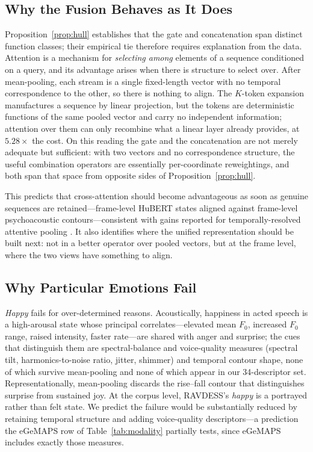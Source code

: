 \documentclass[journal,onecolumn,11pt,draftclsnofoot]{IEEEtran}   %
\begin{document}
\subsection{Why the Fusion Behaves as It Does}
\label{sec:why-fusion}
Proposition~\ref{prop:hull} establishes that the gate and concatenation span
distinct function classes; their empirical tie therefore requires explanation
from the data. Attention is a mechanism for \emph{selecting among} elements of a
sequence conditioned on a query, and its advantage arises when there is
structure to select over. After mean-pooling, each stream is a single
fixed-length vector with no temporal correspondence to the other, so there is
nothing to align. The $K$-token expansion manufactures a sequence by linear
projection, but the tokens are deterministic functions of the same pooled vector
and carry no independent information; attention over them can only recombine
what a linear layer already provides, at $5.28\times$ the cost. On this reading
the gate and the concatenation are not merely adequate but sufficient: with two
vectors and no correspondence structure, the useful combination operators are
essentially per-coordinate reweightings, and both span that space from opposite
sides of Proposition~\ref{prop:hull}.

This predicts that cross-attention should become advantageous as soon as genuine
sequences are retained---frame-level HuBERT states aligned against frame-level
psychoacoustic contours---consistent with gains reported for temporally-resolved
attentive pooling \cite{leygue2025attentivepooling}. It also identifies where
the unified representation should be built next: not in a better operator over
pooled vectors, but at the frame level, where the two views have something to
align.

\subsection{Why Particular Emotions Fail}
\label{sec:why-fail}
\emph{Happy} fails for over-determined reasons. Acoustically, happiness in acted
speech is a high-arousal state whose principal correlates---elevated mean $F_0$,
increased $F_0$ range, raised intensity, faster rate---are shared with anger and
surprise; the cues that distinguish them are spectral-balance and voice-quality
measures (spectral tilt, harmonics-to-noise ratio, jitter, shimmer) and temporal
contour shape, none of which survive mean-pooling and none of which appear in
our 34-descriptor set. Representationally, mean-pooling discards the rise--fall
contour that distinguishes surprise from sustained joy. At the corpus level,
RAVDESS's \emph{happy} is a portrayed rather than felt state. We predict the
failure would be substantially reduced by retaining temporal structure and
adding voice-quality descriptors---a prediction the eGeMAPS row of
Table~\ref{tab:modality} partially tests, since eGeMAPS includes exactly those
measures.
\end{document}
